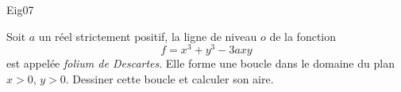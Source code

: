 \begin{tiny}Eig07\end{tiny}
Soit $a$ un réel strictement positif, la ligne de niveau $o$ de la fonction
\begin{displaymath}
 f=x^3+y^3-3axy
\end{displaymath}
est appelée \emph{folium de Descartes}. Elle forme une boucle dans le domaine du plan $x>0$, $y>0$. Dessiner cette boucle et calculer son aire.